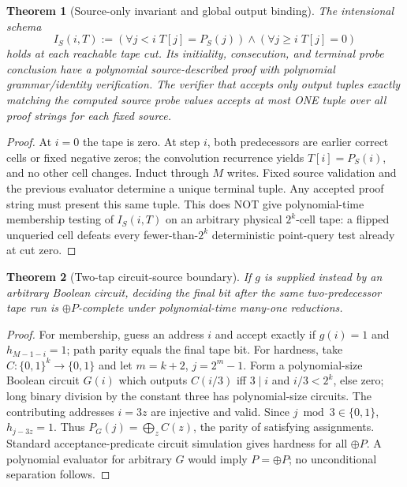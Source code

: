 \documentclass[11pt]{article}
\newtheorem{theorem}{Theorem}
\begin{document}
\begin{theorem}[Source-only invariant and global output binding]
The intensional schema
\[
I_S(i,T):=(\forall j<i\;T[j]=P_S(j))\land(\forall j\ge i\;T[j]=0)
\]
holds at each reachable tape cut. Its initiality, consecution, and terminal probe conclusion have a polynomial source-described proof with polynomial grammar/identity verification. The verifier that accepts only output tuples exactly matching the computed source probe values accepts at most ONE tuple over all proof strings for each fixed source.
\end{theorem}
\begin{proof}
At $i=0$ the tape is zero. At step $i$, both predecessors are earlier correct cells or fixed negative zeros; the convolution recurrence yields $T[i]=P_S(i)$, and no other cell changes. Induct through $M$ writes. Fixed source validation and the previous evaluator determine a unique terminal tuple. Any accepted proof string must present this same tuple. This does NOT give polynomial-time membership testing of $I_S(i,T)$ on an arbitrary physical $2^k$-cell tape: a flipped unqueried cell defeats every fewer-than-$2^k$ deterministic point-query test already at cut zero.
\end{proof}
\begin{theorem}[Two-tap circuit-source boundary]
If $g$ is supplied instead by an arbitrary Boolean circuit, deciding the final bit after the same two-predecessor tape run is $\oplus P$-complete under polynomial-time many-one reductions.
\end{theorem}
\begin{proof}
For membership, guess an address $i$ and accept exactly if $g(i)=1$ and $h_{M-1-i}=1$; path parity equals the final tape bit. For hardness, take $C:\{0,1\}^k\to\{0,1\}$ and let $m=k+2$, $j=2^m-1$. Form a polynomial-size Boolean circuit $G(i)$ which outputs $C(i/3)$ iff $3\mid i$ and $i/3<2^k$, else zero; long binary division by the constant three has polynomial-size circuits. The contributing addresses $i=3z$ are injective and valid. Since $j\bmod3\in\{0,1\}$, $h_{j-3z}=1$. Thus $P_G(j)=\bigoplus_z C(z)$, the parity of satisfying assignments. Standard acceptance-predicate circuit simulation gives hardness for all $\oplus P$. A polynomial evaluator for arbitrary $G$ would imply $P=\oplus P$; no unconditional separation follows.
\end{proof}
\end{document}
